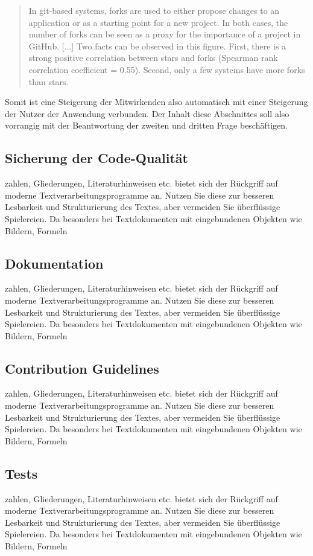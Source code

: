 \begin{quote}
  In git-based systems, forks are used to either propose changes to an application or as
a starting point for a new project. In both cases, the number of forks can be seen as a proxy
for the importance of a project in GitHub. [...] Two facts can be observed in this figure. First, there is a strong positive
correlation between stars and forks (Spearman rank correlation coefficient = 0.55). Second,
only a few systems have more forks than stars.
\end{quote}

Somit ist eine Steigerung der Mitwirkenden also automatisch mit einer Steigerung der Nutzer der Anwendung verbunden. Der Inhalt diese Abschnittes soll also vorrangig mit der Beantwortung der zweiten und dritten Frage beschäftigen.

\subsection{Sicherung der Code-Qualität}
zahlen, Gliederungen, Literaturhinweisen etc. bietet sich der Rückgriff
auf moderne Textverarbeitungsprogramme an. Nutzen Sie diese zur besseren Lesbarkeit
und Strukturierung des Textes, aber vermeiden Sie überflüssige Spielereien. Da
besonders bei Textdokumenten mit eingebundenen Objekten wie Bildern, Formeln

\subsection{Dokumentation}
zahlen, Gliederungen, Literaturhinweisen etc. bietet sich der Rückgriff
auf moderne Textverarbeitungsprogramme an. Nutzen Sie diese zur besseren Lesbarkeit
und Strukturierung des Textes, aber vermeiden Sie überflüssige Spielereien. Da
besonders bei Textdokumenten mit eingebundenen Objekten wie Bildern, Formeln

\subsection{Contribution Guidelines}
zahlen, Gliederungen, Literaturhinweisen etc. bietet sich der Rückgriff
auf moderne Textverarbeitungsprogramme an. Nutzen Sie diese zur besseren Lesbarkeit
und Strukturierung des Textes, aber vermeiden Sie überflüssige Spielereien. Da
besonders bei Textdokumenten mit eingebundenen Objekten wie Bildern, Formeln

\subsection{Tests}
zahlen, Gliederungen, Literaturhinweisen etc. bietet sich der Rückgriff
auf moderne Textverarbeitungsprogramme an. Nutzen Sie diese zur besseren Lesbarkeit
und Strukturierung des Textes, aber vermeiden Sie überflüssige Spielereien. Da
besonders bei Textdokumenten mit eingebundenen Objekten wie Bildern, Formeln

